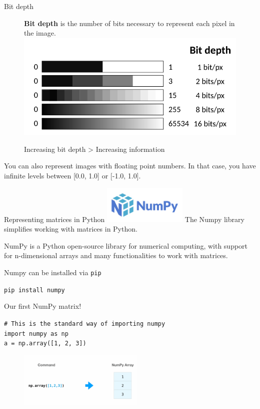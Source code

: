 \documentclass[9pt, aspectratio=169]{beamer}
\begin{document}
\begin{frame}
    {Bit depth}
    \begin{figure}
        \textbf{Bit depth} is the number of bits necessary to represent each pixel in the image.
        \centering
        \includegraphics[width=.6\textwidth]{bitdepth.png}
        \caption{Increasing bit depth > Increasing information}
    \end{figure}
    \pause

    You can also represent images with floating point numbers. In that case, you have infinite levels between [0.0, 1.0] or [-1.0, 1.0].\\
\end{frame}

\begin{frame}
    {Representing matrices in Python}
    \includegraphics[width = 0.3\textwidth]{numpylogo.png}
    The Numpy library simplifies working with matrices in Python.

    NumPy is a Python open-source library for numerical computing, with support for n-dimensional arrays and many functionalities to work with matrices.

    Numpy can be installed via \texttt{pip}

    \begin{codebox}
        \texttt{pip install numpy}
    \end{codebox}
\end{frame}

\begin{frame}
    {Our first NumPy matrix!}

    \begin{codebox}
        \texttt{\# This is the standard way of importing numpy\\
            import numpy as np\\
            a = np.array([1, 2, 3])
        }
    \end{codebox}

    \begin{figure}
        \centering
        \includegraphics[height=100px]{np_array.png}
    \end{figure}
\end{frame}
\end{document}
